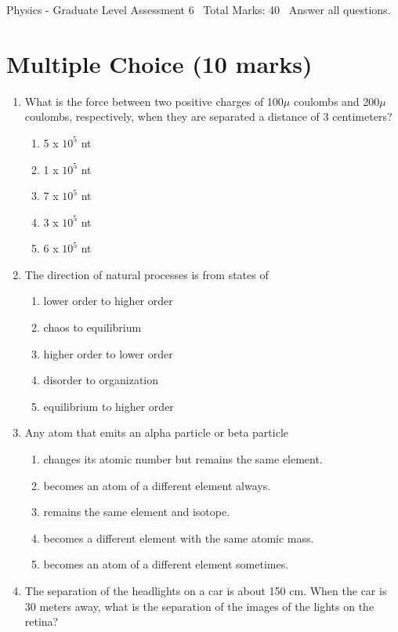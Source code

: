 \documentclass[12pt]{article}
\begin{document}
\begin{center}
Physics - Graduate Level Assessment 6 \
Total Marks: 40 \
Answer all questions.
\end{center}

\section*{Multiple Choice (10 marks)}
\begin{enumerate}[label=\arabic*.]
\item What is the force between two positive charges of 100\ensuremath{\mu} coulombs and 200\ensuremath{\mu} coulombs, respectively, when they are separated a distance of 3 centimeters?
\begin{enumerate}[label=(\alph*)]
    \item 5 x $10^5$ nt
    \item 1 x $10^5$ nt
    \item 7 x $10^5$ nt
    \item 3 x $10^5$ nt
    \item 6 x $10^5$ nt
\end{enumerate}
\item The direction of natural processes is from states of
\begin{enumerate}[label=(\alph*)]
    \item lower order to higher order
    \item chaos to equilibrium
    \item higher order to lower order
    \item disorder to organization
    \item equilibrium to higher order
\end{enumerate}
\item Any atom that emits an alpha particle or beta particle
\begin{enumerate}[label=(\alph*)]
    \item changes its atomic number but remains the same element.
    \item becomes an atom of a different element always.
    \item remains the same element and isotope.
    \item becomes a different element with the same atomic mass.
    \item becomes an atom of a different element sometimes.
\end{enumerate}
\item The separation of the headlights on a car is about 150 cm. When the car is 30 meters away, what is the separation of the images of the lights on the retina?

\end{enumerate}
\end{document}
